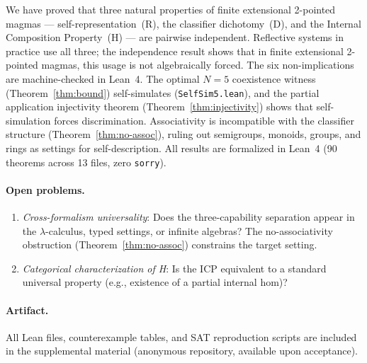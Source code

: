 \documentclass[sigconf,screen,review,anonymous]{acmart}
\theoremstyle{remark}
\begin{document}
We have proved that three natural properties of finite extensional 2-pointed magmas --- self-representation~(R), the classifier dichotomy~(D), and the Internal Composition Property~(H) --- are pairwise independent. Reflective systems in practice use all three; the independence result shows that in finite extensional 2-pointed magmas, this usage is not algebraically forced. The six non-implications are machine-checked in Lean~4. The optimal $N\!=\!5$ coexistence witness (Theorem~\ref{thm:bound}) self-simulates (\texttt{SelfSim5.lean}), and the partial application injectivity theorem (Theorem~\ref{thm:injectivity}) shows that self-simulation forces discrimination. Associativity is incompatible with the classifier structure (Theorem~\ref{thm:no-assoc}), ruling out semigroups, monoids, groups, and rings as settings for self-description. All results are formalized in Lean~4 (90 theorems across 13 files, zero \texttt{sorry}).

\paragraph{Open problems.}
\begin{enumerate}
  \item \emph{Cross-formalism universality}: Does the three-capability separation appear in the $\lambda$-calculus, typed settings, or infinite algebras? The no-associativity obstruction (Theorem~\ref{thm:no-assoc}) constrains the target setting.
  \item \emph{Categorical characterization of H}: Is the ICP equivalent to a standard universal property (e.g., existence of a partial internal hom)?
\end{enumerate}

\paragraph{Artifact.}
All Lean files, counterexample tables, and SAT reproduction scripts are included in the supplemental material (anonymous repository, available upon acceptance).

\end{document}
